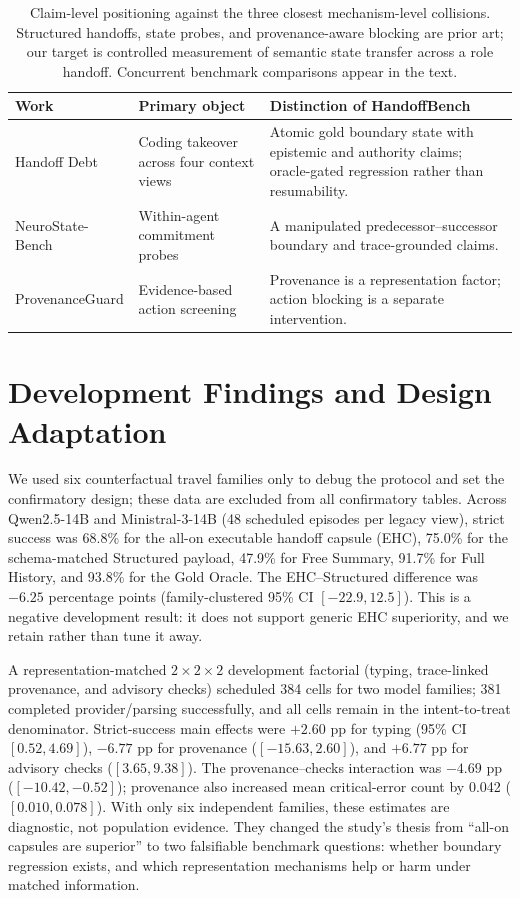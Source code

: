 \begin{table}[t]
\centering
\small
\begin{tabular}{@{}p{}p{}p{}@{}}
\toprule
Work & Primary object & Distinction of HandoffBench \\
\midrule
Handoff Debt
& Coding takeover across four context views
& Atomic gold boundary state with epistemic and authority claims;
oracle-gated regression rather than resumability. \\
NeuroState-Bench
& Within-agent commitment probes
& A manipulated predecessor--successor boundary and trace-grounded claims. \\
Provenance\-Guard
& Evidence-based action screening
& Provenance is a representation factor; action blocking is a separate
intervention. \\
\bottomrule
\end{tabular}
\caption{Claim-level positioning against the three closest mechanism-level
collisions. Structured handoffs, state probes, and provenance-aware blocking
are prior art; our target is controlled measurement of semantic state transfer
across a role handoff. Concurrent benchmark comparisons appear in the text.}
\label{tab:closest-collisions}
\end{table}
\FloatBarrier

\section{Development Findings and Design Adaptation}

We used six counterfactual travel families only to debug the protocol and set
the confirmatory design; these data are excluded from all confirmatory tables.
Across Qwen2.5-14B and Ministral-3-14B (48 scheduled episodes per legacy view),
strict success was 68.8\% for the all-on executable handoff capsule (EHC),
75.0\% for the schema-matched Structured payload, 47.9\% for Free Summary,
91.7\% for Full History, and 93.8\% for the Gold Oracle. The EHC--Structured
difference was $-6.25$ percentage points (family-clustered 95\% CI
$[-22.9,12.5]$). This is a
negative development result: it does not support generic EHC superiority, and
we retain rather than tune it away.

A representation-matched $2\!\times\!2\!\times\!2$ development factorial
(typing, trace-linked provenance, and advisory checks) scheduled 384 cells for
two model families; 381 completed provider/parsing successfully, and all cells remain in
the intent-to-treat denominator. Strict-success main effects were $+2.60$ pp
for typing (95\% CI $[0.52,4.69]$), $-6.77$ pp for provenance
($[-15.63,2.60]$), and $+6.77$ pp for advisory checks
($[3.65,9.38]$). The provenance--checks interaction was $-4.69$ pp
($[-10.42,-0.52]$); provenance also increased mean critical-error count by
0.042 ($[0.010,0.078]$). With only six independent families, these
estimates are diagnostic, not population evidence. They changed the study's
thesis from ``all-on capsules are superior'' to two falsifiable benchmark
questions: whether boundary regression exists, and which representation
mechanisms help or harm under matched information.

